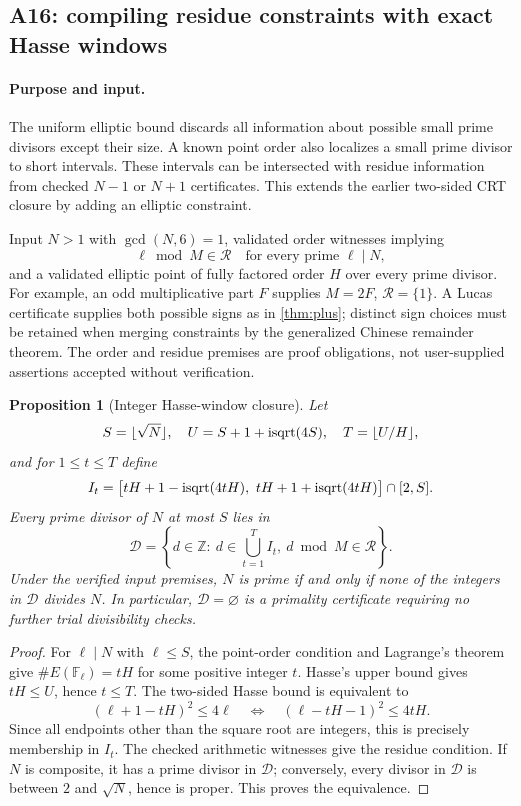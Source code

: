 \documentclass[11pt,a4paper]{article}
\newtheorem{proposition}[theorem]{Proposition}
\theoremstyle{definition}\newtheorem{definition}[theorem]{Definition}
\theoremstyle{remark}\newtheorem{remark}[theorem]{Remark}
\newcommand{\Z}{\mathbb Z}\newcommand{\F}{\mathbb F}
\begin{document}
\subsection{A16: compiling residue constraints with exact Hasse windows}
\label{alg:A16}

\paragraph{Purpose and input.}
The uniform elliptic bound discards all information about possible small
prime divisors except their size.  A known point order also localizes a
small prime divisor to short intervals.  These intervals can be
intersected with residue information from checked $N-1$ or $N+1$
certificates.  This extends the earlier two-sided CRT closure by adding
an elliptic constraint.

Input $N>1$ with $\gcd(N,6)=1$, validated order witnesses implying
\[
 \ell\bmod M\in\mathcal R\quad\text{for every prime }\ell\mid N,
\]
and a validated elliptic point of fully factored order $H$ over every
prime divisor.  For example, an odd multiplicative part $F$ supplies
$M=2F$, $\mathcal R=\{1\}$.  A Lucas certificate supplies both possible
signs as in \cref{thm:plus}; distinct sign choices must be retained when
merging constraints by the generalized Chinese remainder theorem.
The order and residue premises are proof obligations, not user-supplied
assertions accepted without verification.

\begin{proposition}[Integer Hasse-window closure]\label{prop:cert-hasse-window}
Let
\[
 S=\lfloor\sqrt N\rfloor,\quad
 U=S+1+\operatorname{isqrt}(4S),\quad T=\lfloor U/H\rfloor,
\]
and for $1\le t\le T$ define
\[
 I_t=\bigl[tH+1-\isqrt(4tH),\ tH+1+\isqrt(4tH)\bigr]\cap[2,S].
\]
Every prime divisor of $N$ at most $S$ lies in
\[
 \mathcal D=\left\{d\in\Z:\ d\in\bigcup_{t=1}^{T}I_t,
                         \ d\bmod M\in\mathcal R\right\}.
\]
Under the verified input premises, $N$ is prime if and only if none of the
integers in $\mathcal D$ divides $N$.  In particular,
$\mathcal D=\varnothing$ is a primality certificate requiring no further
trial divisibility checks.
\end{proposition}

\begin{proof}
For $\ell\mid N$ with $\ell\le S$, the point-order condition and Lagrange's
theorem give $\#E(\F_\ell)=tH$ for some positive integer $t$.
Hasse's upper bound gives $tH\le U$, hence $t\le T$.  The two-sided Hasse
bound is equivalent to
\[
 (\ell+1-tH)^2\le4\ell
 \quad\Longleftrightarrow\quad
 (\ell-tH-1)^2\le4tH.
\]
Since all endpoints other than the square root are integers, this is
precisely membership in $I_t$.  The checked arithmetic witnesses give the
residue condition.  If $N$ is composite, it has a prime divisor in
$\mathcal D$; conversely, every divisor in $\mathcal D$ is between $2$ and
$\sqrt N$, hence is proper.  This proves the equivalence.
\end{proof}
\end{document}
